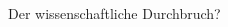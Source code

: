 \begin{frame}{Der wissenschaftliche Durchbruch?}
\begin{columns}
\begin{column}{0.4\textwidth}
\begin{center}
            \end{center}
        \end{column}
    \end{columns}
\end{frame}
